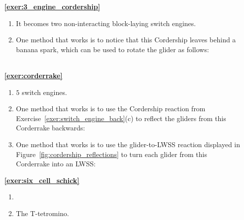 \begin{multicols}{2}
\begin{itemize}[leftmargin=0em]
	
	\item[\bf\color{ocre}\sffamily\ref{exer:3_engine_cordership}]
		\begin{enumerate}[leftmargin=1.5em,label=\bf\color{ocre}(\alph*)]
			\item It becomes two non-interacting block-laying switch engines.
			
			\item One method that works is to notice that this Cordership leaves behind a banana spark, which can be used to rotate the glider as follows: \\[-0.6em]
			
			 \\
		\end{enumerate}
		
		
	\item[\bf\color{ocre}\sffamily\ref{exer:corderrake}]
		\begin{enumerate}[leftmargin=1.5em,label=\bf\color{ocre}(\alph*)]
			\item $5$ switch engines.
			
			\item One method that works is to use the Cordership reaction from Exercise~\ref{exer:switch_engine_back}(c) to reflect the gliders from this Corderrake backwards: \\[-0.6em]
			
			
			\item One method that works is to use the glider-to-LWSS reaction displayed in Figure~\ref{fig:cordership_reflections} to turn each glider from this Corderrake into an LWSS: \\[-0.6em]
			
		\end{enumerate}
		
		
	\item[\bf\color{ocre}\sffamily\ref{exer:six_cell_schick}]
		\begin{enumerate}[leftmargin=1.5em,label=\bf\color{ocre}(\alph*)]
			\item {} \\
			
			\item The T-tetromino. \\
		\end{enumerate}
		

\end{itemize}
\end{multicols}
